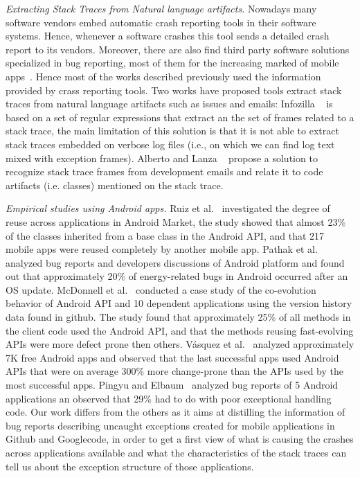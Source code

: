 \documentclass[conference]{IEEEtran}
\begin{document}
\textit{Extracting Stack Traces from Natural language artifacts.} Nowadays many software vendors embed automatic crash reporting tools in their software systems. Hence, whenever a software crashes this tool sends a detailed crash report to its vendors. Moreover, there are also find third party software solutions specialized in bug reporting, most of them for the increasing marked of mobile apps~\cite{BugSe14,BugSn14,Googl14,Acra14}. Hence most of the works described previously used the  information provided by crass reporting tools. Two works have proposed tools extract stack traces from natural language artifacts such as issues and emails: Infozilla ~\cite{bettenburg2008extracting} is based on a set of regular expressions that extract an the set of frames related to a stack trace, the main limitation of this solution is that it is not able to extract stack traces embedded on verbose log files (i.e., on which we can find log text mixed with exception frames). Alberto and Lanza ~\cite{bacchelli2012content}  propose a solution to recognize stack trace frames from development emails and relate it to code artifacts (i.e. classes) mentioned on the stack trace.    

\textit{Empirical studies using Android apps.} Ruiz et al.~\cite{Ruiz12} investigated the degree of reuse across applications in Android Market, the study showed that almost 23\% of the classes inherited
from a base class in the Android API, and that 217 mobile apps were reused
completely by another mobile app. Pathak et al.~\cite{Patha11} analyzed bug
reports and developers discussions of Android platform and found out that
approximately 20\% of energy-related bugs in Android occurred after an OS
update. McDonnell et al.~\cite{McDon13} conducted a case study of the
co-evolution behavior of Android API and 10 dependent applications using the
version history data found in github. The study found that approximately 25\% of
all methods in the client code used the Android API, and that the methods
reusing fast-evolving APIs were more defect prone then others. Vásquez et
al.~\cite{Linar13} analyzed approximately 7K free Android apps and observed that
the last successful apps used Android APIs that were on average 300\% more
change-prone than the APIs used by the most successful apps. Pingyu and
Elbaum~\cite{Zhang12} analyzed bug reports of 5 Android applications an observed
that 29\% had to do with poor exceptional handling code.  Our work differs from
the others as it aims at distilling the information of bug reports describing
uncaught exceptions created for mobile applications in Github and Googlecode, in
order to get a first view of what is causing the crashes across applications
available and what the characteristics of the stack traces can tell us about the
exception structure of those applications. %
\end{document}
